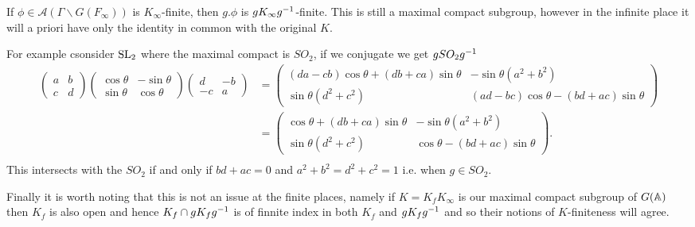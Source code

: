 \begin{example}
    If \(\phi\in \mathcal{A}(\Gamma \backslash G(F_\infty))\) is \(K_\infty\)-finite, then \(g.\phi\) is \(gK_\infty g^{-1}\)-finite. This is still a maximal compact subgroup, however in the infinite place it will a priori have only the identity in common with the original \(K\).

    For example csonsider \(\operatorname{SL}_2\) where the maximal compact is \(SO_2\), if we conjugate we get \(gSO_2g^{-1}\)
    \begin{align*}
        \begin{pmatrix}
            a & b\\
            c & d
        \end{pmatrix}
        \begin{pmatrix}
            \cos\theta & -\sin\theta \\
            \sin\theta & \cos\theta
        \end{pmatrix}
        \begin{pmatrix}
            d & -b\\
            -c & a
        \end{pmatrix} &=  \begin{pmatrix}
            (da - cb)\cos\theta + (db  + ca)\sin\theta & -\sin\theta( a^2+b^2)\\
            \sin\theta(d^2 + c^2) & ( ad  -bc)\cos\theta - (b d  + ac)\sin\theta
        \end{pmatrix}\\
        &=  \begin{pmatrix}
            \cos\theta + (db  + ca)\sin\theta & -\sin\theta( a^2+b^2)\\
            \sin\theta(d^2 + c^2) & \cos\theta - (b d  + ac)\sin\theta
        \end{pmatrix}.\\
    \end{align*}
    This intersects with the \(SO_2\) if and only if \(bd+ac = 0\) and \(a^2 + b^2 = d^2 + c^2 = 1\) i.e. when \(g\in SO_2\).

    Finally it is worth noting that this is not an issue at the finite places, namely if \(K = K_fK_\infty\) is our maximal compact subgroup of \(G(\A)\) then \(K_f\) is also open and hence \(K_f \cap gK_f g^{-1}\) is of finnite index in both \(K_f\) and \(gK_f g^{-1}\) and so their notions of \(K\)-finiteness will agree. 
\end{example}

